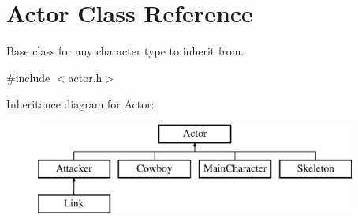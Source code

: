 \hypertarget{classActor}{}\section{Actor Class Reference}
\label{classActor}


Base class for any character type to inherit from.  




{\ttfamily \#include $<$actor.\+h$>$}

Inheritance diagram for Actor\+:\begin{figure}[H]
\begin{center}
\leavevmode
\includegraphics[height=3.000000cm]{classActor}
\end{center}
\end{figure}
